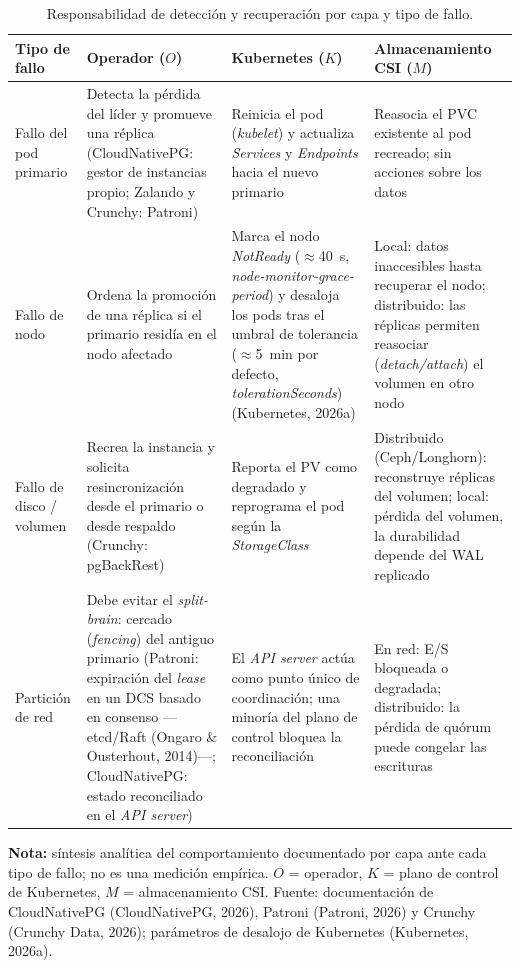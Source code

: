 \documentclass[12pt,twocolumn,letterpaper]{article}
\newcommand{\fignota}[1]{\par\vspace{2pt}\begingroup\footnotesize\justifying
  \textbf{Nota:} #1\par\endgroup}
\begin{document}
\begin{table}[tb]
\centering
\footnotesize
\renewcommand{\arraystretch}{1.25}
\begin{tabularx}{\textwidth}{@{}p{2.4cm} X X X@{}}
\toprule
\textbf{Tipo de fallo} & \textbf{Operador ($O$)} & \textbf{Kubernetes ($K$)} & \textbf{Almacenamiento CSI ($M$)} \\
\midrule
Fallo del pod primario &
Detecta la pérdida del líder y promueve una réplica (CloudNativePG: gestor de instancias propio; Zalando y Crunchy: Patroni) &
Reinicia el pod (\textit{kubelet}) y actualiza \textit{Services} y \textit{Endpoints} hacia el nuevo primario &
Reasocia el PVC existente al pod recreado; sin acciones sobre los datos \\
Fallo de nodo &
Ordena la promoción de una réplica si el primario residía en el nodo afectado &
Marca el nodo \textit{NotReady} ($\approx$40~s, \textit{node-monitor-grace-period}) y desaloja los pods tras el umbral de tolerancia ($\approx$5~min por defecto, \textit{tolerationSeconds}) (Kubernetes, 2026a) &
Local: datos inaccesibles hasta recuperar el nodo; distribuido: las réplicas permiten reasociar (\textit{detach/attach}) el volumen en otro nodo \\
Fallo de disco / volumen &
Recrea la instancia y solicita resincronización desde el primario o desde respaldo (Crunchy: pgBackRest) &
Reporta el PV como degradado y reprograma el pod según la \textit{StorageClass} &
Distribuido (Ceph/Longhorn): reconstruye réplicas del volumen; local: pérdida del volumen, la durabilidad depende del WAL replicado \\
Partición de red &
Debe evitar el \textit{split-brain}: cercado (\textit{fencing}) del antiguo primario (Patroni: expiración del \textit{lease} en un DCS basado en consenso —etcd/Raft (Ongaro \& Ousterhout, 2014)—; CloudNativePG: estado reconciliado en el \textit{API server}) &
El \textit{API server} actúa como punto único de coordinación; una minoría del plano de control bloquea la reconciliación &
En red: E/S bloqueada o degradada; distribuido: la pérdida de quórum puede congelar las escrituras \\
\bottomrule
\end{tabularx}
\caption{Responsabilidad de detección y recuperación por capa y tipo de fallo.}
\label{tab:responsabilidad}
\fignota{síntesis analítica del comportamiento documentado por capa ante cada tipo de fallo; no es una medición empírica. $O$ = operador, $K$ = plano de control de Kubernetes, $M$ = almacenamiento CSI. Fuente: documentación de CloudNativePG (CloudNativePG, 2026), Patroni (Patroni, 2026) y Crunchy (Crunchy Data, 2026); parámetros de desalojo de Kubernetes (Kubernetes, 2026a).}
\end{table}
\end{document}

